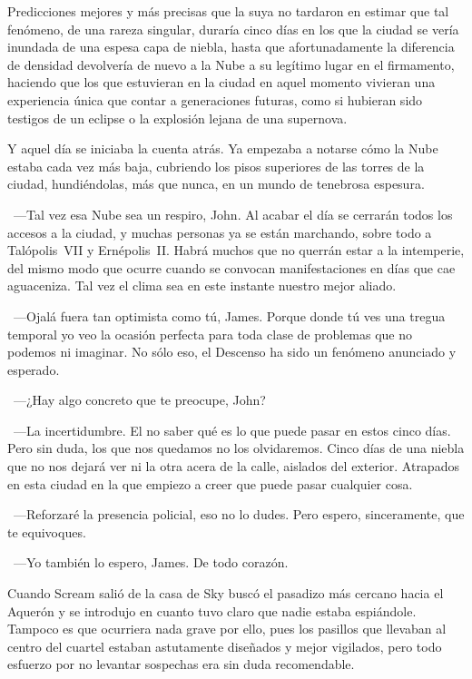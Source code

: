 Predicciones mejores y más precisas que la suya no tardaron en estimar que tal fenómeno, de una rareza singular, duraría cinco días en los que la ciudad se vería inundada de una espesa capa de niebla, hasta que afortunadamente la diferencia de densidad devolvería de nuevo a la Nube a su legítimo lugar en el firmamento, haciendo que los que estuvieran en la ciudad en aquel momento vivieran una experiencia única que contar a generaciones futuras, como si hubieran sido testigos de un eclipse o la explosión lejana de una supernova.

Y aquel día se iniciaba la cuenta atrás. Ya empezaba a notarse cómo la Nube estaba cada vez más baja, cubriendo los pisos superiores de las torres de la ciudad, hundiéndolas, más que nunca, en un mundo de tenebrosa espesura.

~---Tal vez esa Nube sea un respiro, John. Al acabar el día se cerrarán todos los accesos a la ciudad, y muchas personas ya se están marchando, sobre todo a Talópolis~VII y Ernépolis~II. Habrá muchos que no querrán estar a la intemperie, del mismo modo que ocurre cuando se convocan manifestaciones en días que cae aguaceniza. Tal vez el clima sea en este instante nuestro mejor aliado.

~---Ojalá fuera tan optimista como tú, James. Porque donde tú ves una tregua temporal yo veo la ocasión perfecta para toda clase de problemas que no podemos ni imaginar. No sólo eso, el Descenso ha sido un fenómeno anunciado y esperado.

~---¿Hay algo concreto que te preocupe, John?

~---La incertidumbre. El no saber qué es lo que puede pasar en estos cinco días. Pero sin duda, los que nos quedamos no los olvidaremos. Cinco días de una niebla que no nos dejará ver ni la otra acera de la calle, aislados del exterior. Atrapados en esta ciudad en la que empiezo a creer que puede pasar cualquier cosa.

~---Reforzaré la presencia policial, eso no lo dudes. Pero espero, sinceramente, que te equivoques.

~---Yo también lo espero, James. De todo corazón.

\parbreak
Cuando Scream salió de la casa de Sky buscó el pasadizo más cercano hacia el Aquerón y se introdujo en cuanto tuvo claro que nadie estaba espiándole. Tampoco es que ocurriera nada grave por ello, pues los pasillos que llevaban al centro del cuartel estaban astutamente diseñados y mejor vigilados, pero todo esfuerzo por no levantar sospechas era sin duda recomendable.

